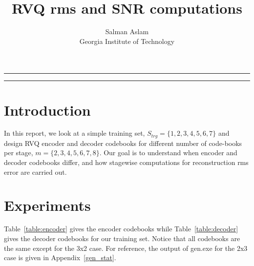 
\title{RVQ rms and SNR computations}
\author{Salman Aslam\\ Georgia Institute of Technology}
\date{}


\maketitle
\rule[0pt]{\textwidth}{1pt}
\tableofcontents
\rule[0pt]{\textwidth}{1pt}


\section{Introduction}
In this report, we look at a simple training set, $S_{trg}=\{1,2,3,4,5,6,7\}$ and design RVQ encoder and decoder codebooks for different number of code-books per stage, $m=\{2,3,4,5,6,7,8\}$.  Our goal is to understand when encoder and decoder codebooks differ, and how stagewise computations for reconstruction rms error are carried out.


\section{Experiments}

Table~\ref{table:encoder} gives the encoder codebooks while Table~\ref{table:decoder} gives the decoder codebooks for our training set.  Notice that all codebooks are the same except for the 3x2 case.  For reference, the output of gen.exe for the 2x3 case is given in Appendix~\ref{gen_stat}.

